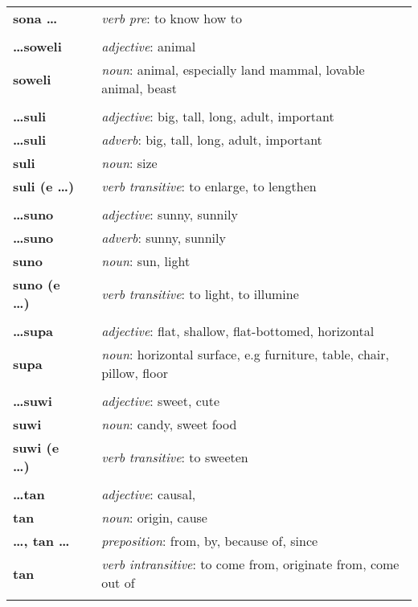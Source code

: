\begin{supertabular}{p{2,5cm}|ll}
\textbf{sona \dots} && \textit{verb pre}: to know how to \\ 
 && \\ %
\textbf{\dots soweli} && \textit{adjective}: animal \\ 
\textbf{soweli} && \textit{noun}: animal, especially land mammal, lovable animal, beast \\ 
 && \\ %
\textbf{\dots suli} && \textit{adjective}: big, tall, long, adult, important \\ 
\textbf{\dots suli} && \textit{adverb}: big, tall, long, adult, important \\ 
\textbf{suli} && \textit{noun}: size \\ 
\textbf{suli (e \dots)} && \textit{verb transitive}: to enlarge, to lengthen \\ 
 && \\ %
\textbf{\dots suno} && \textit{adjective}: sunny, sunnily \\ 
\textbf{\dots suno} && \textit{adverb}: sunny, sunnily \\ 
\textbf{suno} && \textit{noun}: sun, light \\ 
\textbf{suno (e \dots)} && \textit{verb transitive}: to light, to illumine \\ 
 && \\ %
 \textbf{\dots supa} && \textit{adjective}: flat, shallow, flat-bottomed, horizontal \\ 
\textbf{supa} && \textit{noun}: horizontal surface, e.g furniture, table, chair, pillow, floor \\ 
 && \\ %
\textbf{\dots suwi} && \textit{adjective}: sweet, cute \\ 
\textbf{suwi} && \textit{noun}: candy, sweet food \\ 
\textbf{suwi (e \dots)} && \textit{verb transitive}: to sweeten \\ 
 && \\ %
\textbf{\dots tan} && \textit{adjective}: causal, \\ 
\textbf{tan} && \textit{noun}: origin, cause \\ 
\textbf{\dots , tan \dots} && \textit{preposition}: from, by, because of, since \\ 
\textbf{tan} && \textit{verb intransitive}: to come from, originate from, come out of \\ 
 && \\ %

\end{supertabular}
